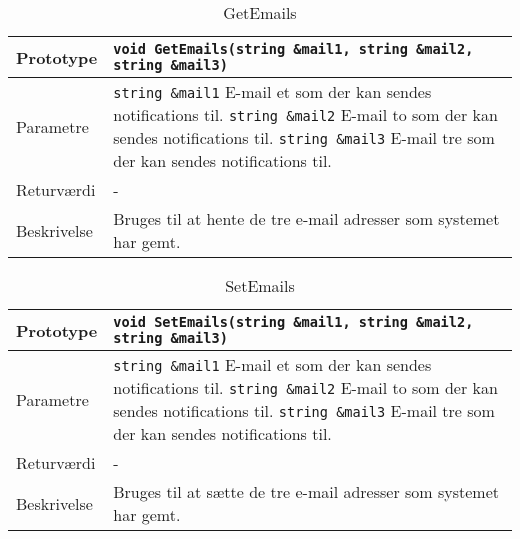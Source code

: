 \begin{table}[h]
\begin{tabularx}{\textwidth}{| >{\raggedright\arraybackslash}p{2.5 cm} | >{\raggedright\arraybackslash}X |} \hline
Prototype & \texttt{void GetEmails(string \&mail1, string \&mail2, string \&mail3)} \\\hline
Parametre & \texttt{string \&mail1} \newline E-mail et som der kan sendes notifications til. \newline
\texttt{string \&mail2} \newline E-mail to som der kan sendes notifications til.
\newline
\texttt{string \&mail3} \newline E-mail tre som der kan sendes notifications til.
 \\\hline
Returværdi & - \\\hline
Beskrivelse & Bruges til at hente de tre e-mail adresser som systemet har gemt. \\\hline
\end{tabularx}
\caption{GetEmails}
\label{table:GetEmails}
\end{table}

\begin{table}[h]
\begin{tabularx}{\textwidth}{| >{\raggedright\arraybackslash}p{2.5 cm} | >{\raggedright\arraybackslash}X |} \hline
Prototype & \texttt{void SetEmails(string \&mail1, string \&mail2, string \&mail3)} \\\hline
Parametre & \texttt{string \&mail1} \newline E-mail et som der kan sendes notifications til. \newline
\texttt{string \&mail2} \newline E-mail to som der kan sendes notifications til.
\newline
\texttt{string \&mail3} \newline E-mail tre som der kan sendes notifications til.
 \\\hline
Returværdi & - \\\hline
Beskrivelse & Bruges til at sætte de tre e-mail adresser som systemet har gemt. \\\hline
\end{tabularx}
\caption{SetEmails}
\label{table:SetEmails}
\end{table}

